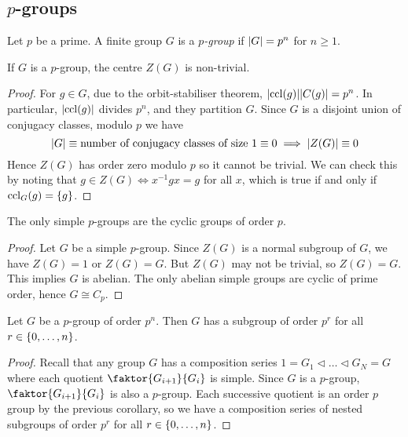 \subsection{\( p \)-groups}
\begin{definition}
	Let \( p \) be a prime.
	A finite group \( G \) is a \textit{\( p \)-group} if \( \abs{G} = p^n \) for \( n \geq 1 \).
\end{definition}
\begin{theorem}
	If \( G \) is a \( p \)-group, the centre \( Z(G) \) is non-trivial.
\end{theorem}
\begin{proof}
	For \( g \in G \), due to the orbit-stabiliser theorem, \( \abs{\operatorname{ccl}(g)} \abs{C(g)} = p^n \).
	In particular, \( \abs{\operatorname{ccl}(g)} \) divides \( p^n \), and they partition \( G \).
	Since \( G \) is a disjoint union of conjugacy classes, modulo \( p \) we have
	\[
		\abs{G} \equiv \text{number of conjugacy classes of size } 1 \equiv 0 \implies \abs{Z(G)} \equiv 0
	\]
	Hence \( Z(G) \) has order zero modulo \( p \) so it cannot be trivial.
	We can check this by noting that \( g \in Z(G) \iff x^{-1} g x = g \) for all \( x \), which is true if and only if \( \operatorname{ccl}_G(g) = \qty{g} \).
\end{proof}
\begin{corollary}
	The only simple \( p \)-groups are the cyclic groups of order \( p \).
\end{corollary}
\begin{proof}
	Let \( G \) be a simple \( p \)-group.
	Since \( Z(G) \) is a normal subgroup of \( G \), we have \( Z(G) = 1 \) or \( Z(G) = G \).
	But \( Z(G) \) may not be trivial, so \( Z(G) = G \).
	This implies \( G \) is abelian.
	The only abelian simple groups are cyclic of prime order, hence \( G \cong C_p \).
\end{proof}
\begin{corollary}
	Let \( G \) be a \( p \)-group of order \( p^n \).
	Then \( G \) has a subgroup of order \( p^r \) for all \( r \in \qty{0, \dots, n} \).
\end{corollary}
\begin{proof}
	Recall that any group \( G \) has a composition series \( 1 = G_1 \vartriangleleft \dots \vartriangleleft G_N = G \) where each quotient \( \faktor{G_{i+1}}{G_i} \) is simple.
	Since \( G \) is a \( p \)-group, \( \faktor{G_{i+1}}{G_i} \) is also a \( p \)-group.
	Each successive quotient is an order \( p \) group by the previous corollary, so we have a composition series of nested subgroups of order \( p^r \) for all \( r \in \qty{0, \dots, n} \).
\end{proof}

